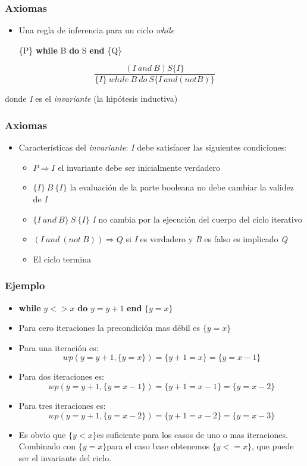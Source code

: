 \documentclass[11pt]{article}
\begin{document}
\subsubsection*{Axiomas}
\label{sec:org675e4ce}
\begin{itemize}
\item Una regla de inferencia para un ciclo \emph{while}

\{P\} \textbf{while} B \textbf{do} S \textbf{end} \{Q\}
\end{itemize}

\[ \frac{ (I \ and \ B ) S \{I\} }{\{I\} \ while \ B \ do \ S \{I \
and (not B)\}} \]

donde \emph{I} es el \emph{invariante} (la hipótesis inductiva)

\subsubsection*{Axiomas}
\label{sec:org245dbd6}
\begin{itemize}
\item Características del \emph{invariante}: \emph{I} debe satisfacer las siguientes
condiciones:
\begin{itemize}
\item \(P \Rightarrow I\) el invariante debe ser inicialmente verdadero
\item \(\{I\} \ B \ \{I\}\) la evaluación de la parte booleana no
debe cambiar la validez de \emph{I}
\item \(\{I \ and \ B \} \ S \ \{I\}\) \emph{I} no cambia por la ejecución
del cuerpo del ciclo  iterativo
\item \((I \ and \ (not \ B)) \Rightarrow Q\) si \emph{I} es verdadero y
\emph{B} es falso es implicado \emph{Q}
\item El ciclo termina
\end{itemize}
\end{itemize}

\subsubsection*{Ejemplo}
\label{sec:org1ce24d2}
\begin{itemize}
\item \textbf{while} \(y <> x\) \textbf{do} \(y = y + 1\) \textbf{end} \(\{ y = x \}\)
\end{itemize}
\begin{itemize}
\item Para cero iteraciones la precondición mas débil es \(\{ y = x \}\)
\item Para una iteración es: \[ wp( y = y + 1, \{y = x\}) = \{ y + 1 = x \} = \{ y = x - 1 \} \]
\item Para dos iteraciones es:\[ wp( y = y + 1, \{y = x - 1\}) = \{ y + 1 = x - 1\} = \{ y = x - 2 \} \]
\item Para tres iteraciones es:\[ wp( y = y + 1, \{y = x - 2\}) = \{ y + 1 = x - 2\} = \{ y = x - 3 \} \]
\item Es obvio que \(\{y <  x \}\)es suficiente para los casos de uno o mas
iteraciones. Combinado con \(\{y = x \}\)para el caso base
obtenemos  \(\{y <= x \}\), que puede ser el invariante del ciclo.
\end{itemize}
\end{document}
